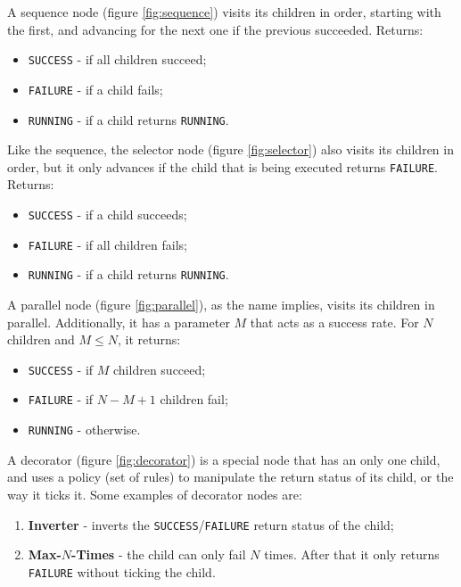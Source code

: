 \documentclass[a4paper,UKenglish,cleveref, autoref, thm-restate]{oasics-v2019}
\begin{document}
A sequence node (figure \ref{fig:sequence}) visits its children in order, starting with the first, and advancing for the next one if the previous succeeded.
Returns:
\begin{itemize}
    \item \texttt{SUCCESS} - if all children succeed;
    \item \texttt{FAILURE} - if a child fails;
    \item \texttt{RUNNING} - if a child returns \texttt{RUNNING}.
\end{itemize}


Like the sequence, the selector node (figure \ref{fig:selector}) also visits its children in order, but it only advances if the child that is being executed returns \texttt{FAILURE}.
Returns:
\begin{itemize}
    \item \texttt{SUCCESS} - if a child succeeds;
    \item \texttt{FAILURE} - if all children fails;
    \item \texttt{RUNNING} - if a child returns \texttt{RUNNING}.
\end{itemize}


A parallel node (figure \ref{fig:parallel}), as the name implies, visits its children in parallel.
Additionally, it has a parameter $M$ that acts as a success rate.
For $N$ children and $M \leq N$, it returns:
\begin{itemize}
    \item \texttt{SUCCESS} - if $M$ children succeed;
    \item \texttt{FAILURE} - if $N - M + 1$ children fail;
    \item \texttt{RUNNING} - otherwise.
\end{itemize}



A decorator (figure \ref{fig:decorator}) is a special node that has an only one child, and uses a policy (set of rules) to manipulate the return status of its child, or the way it ticks it.
Some examples of decorator nodes are:
\begin{enumerate}
    \item \textbf{Inverter} - inverts the \texttt{SUCCESS}/\texttt{FAILURE} return status of the child;
    \item \textbf{Max-$N$-Times} - the child can only fail $N$ times.
    After that it only returns \texttt{FAILURE} without ticking the child.
\end{enumerate}
\end{document}
